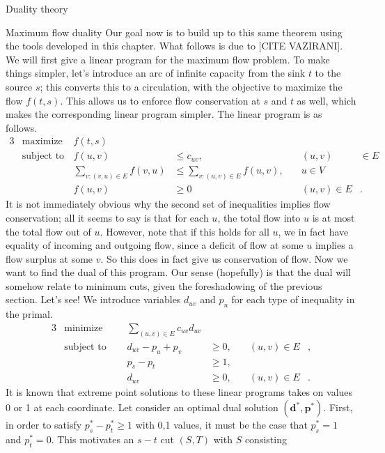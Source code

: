 \documentclass[11pt]{article}
\renewcommand{\'}{^{'}}
\begin{document}
\begin{section}{Duality theory}
\begin{subsection}{Maximum flow duality}
	Our goal now is to build up to this same theorem using the tools developed in this chapter. 
	What follows is due to [CITE VAZIRANI]. We will first give a linear program for the 
	maximum flow problem. To make things simpler, let's introduce an arc of infinite capacity 
	from the sink $t$ to the source $s$; this converts this to a circulation, with the objective to 
	maximize the flow $f(t,s)$. This allows us to enforce flow conservation at $s$ and $t$ as well, 
	which makes the corresponding linear program simpler. The linear program is as follows.
	\begin{alignat*}{3}
		& \text{maximize } & f(t,s)\\
		& \text{subject to } & f(u,v) &\leq c_{uv}, &\quad (u,v)&\in E\\ 
				     && \sum_{v:(v,u)\in E} f(v,u) & \leq \sum_{v:(u,v)\in E} f(u,v), &
				     	\quad u\in V &\\
				     && f(u,v) &\geq 0 &\quad (u,v)\in E &.
	\end{alignat*}
	It is not immediately obvious why the second set of inequalities implies flow conservation; all 
	it seems to say is that for each $u$, the total flow into $u$ is at most the total flow out 
	of $u$. However, note that if this holds for all $u$, we in fact have equality of incoming and 
	outgoing flow, since a deficit of flow at some $u$ implies a flow surplus at some $v$. So 
	this does in fact give us conservation of flow. Now we want to find the dual of this program. 
	Our sense (hopefully) is that the dual will somehow relate to minimum cuts, given the 
	foreshadowing of the previous section. Let's see! We introduce variables $d_{uv}$ and $p_u$ for 
	each type of inequality in the primal.
	\begin{alignat}{3}
		& \text{minimize } & \sum_{(u,v)\in E} c_{uv} d_{uv}& \\
		& \text{subject to } \quad & d_{uv} - p_u + p_v & \geq 0, & \quad (u,v)\in E &, \\
				    && p_s - p_t & \geq 1, & \\
				    && d_{uv} & \geq 0, & \quad (u,v) \in E &.
	\end{alignat}
	It is known that extreme point solutions to these linear programs takes on values 0 or 1 at 
	each coordinate. Let consider an optimal dual solution $(\mathbf{d}^{*},\mathbf{p}^{*})$. 
	First, in order to satisfy $p_s^{*} - p_{t}^{*} \geq 1$ with 0,1 values, it must be the case 
	that $p_s^{*} = 1$ and $p_t^{*} = 0$. This motivates an $s-t$ cut $(S,T)$ with $S$ consisting 

\end{subsection}
\end{section}
\end{document}
